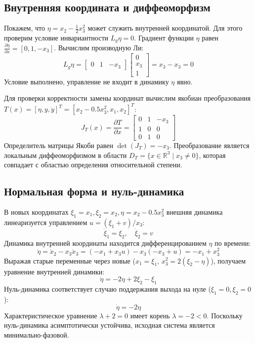 \documentclass[a4paper,12pt]{article}
\begin{document}
\subsection{Внутренняя координата и диффеоморфизм}
Покажем, что $\eta = x_2 - \frac{1}{2}x_3^2$ может служить внутренней координатой. Для этого проверим условие инвариантности $L_g \eta = 0$.
Градиент функции $\eta$ равен $\frac{\partial \eta}{\partial x} = [0, 1, -x_3]$. Вычислим производную Ли:
\[ L_g \eta = \begin{bmatrix} 0 & 1 & -x_3 \end{bmatrix} \begin{bmatrix} 0 \\ x_3 \\ 1 \end{bmatrix} = x_3 - x_3 = 0 \]
Условие выполнено, управление не входит в динамику $\eta$ явно.

Для проверки корректности замены координат вычислим якобиан преобразования $T(x) = [\eta, y, \dot{y}]^T = [x_2 - 0.5x_3^2, x_1, x_2]^T$:
\[ J_T(x) = \frac{\partial T}{\partial x} = \begin{bmatrix} 0 & 1 & -x_3 \\ 1 & 0 & 0 \\ 0 & 1 & 0 \end{bmatrix} \]
Определитель матрицы Якоби равен $\det(J_T) = -x_3$. Преобразование является локальным диффеоморфизмом в области $D_T = \{ x \in \mathbb{R}^3 \mid x_3 \neq 0 \}$, которая совпадает с областью определения относительной степени.

\subsection{Нормальная форма и нуль-динамика}
В новых координатах $\xi_1=x_1, \xi_2=x_2, \eta=x_2-0.5x_3^2$ внешняя динамика линеаризуется управлением $u=(\xi_1+v)/x_3$:
\[ \dot{\xi}_1 = \xi_2, \quad \dot{\xi}_2 = v \]
Динамика внутренней координаты находится дифференцированием $\eta$ по времени:
\[ \dot{\eta} = \dot{x}_2 - x_3\dot{x}_3 = (-x_1+x_3u) - x_3(-x_3+u) = -x_1 + x_3^2 \]
Выражая старые переменные через новые ($x_1=\xi_1$, $x_3^2 = 2(\xi_2-\eta)$), получаем уравнение внутренней динамики:
\[ \dot{\eta} = -2\eta + 2\xi_2 - \xi_1 \]
Нуль-динамика соответствует случаю поддержания выхода на нуле ($\xi_1=0, \xi_2=0$):
\[ \dot{\eta} = -2\eta \]
Характеристическое уравнение $\lambda+2=0$ имеет корень $\lambda=-2 < 0$. Поскольку нуль-динамика асимптотически устойчива, исходная система является минимально-фазовой.
	
\end{document}
